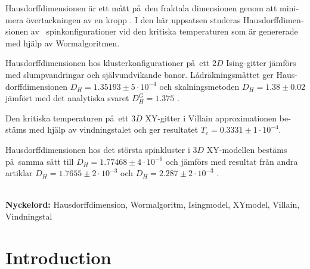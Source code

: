 \documentclass[nocoverpage,swedish,g5paper]{thesis}
\begin{document}
\begin{otherlanguage}{swedish}
\begin{foreginabstract}
Hausdorffdimensionen \"ar ett m\aa tt p\aa \ den fraktala dimensionen genom att minimera \"overtackningen av en kropp \cite{Heinonen:HausdorffDimMath}. I den h\"ar uppsatsen studeras Hausdorffdimensionen av \ spinkonfigurationer vid den kritiska temperaturen som \"ar genererade med hj\"alp av Wormalgoritmen.

Hausdorffdimensionen hos klusterkonfigurationer p\aa \ ett $2D$ Ising-gitter j\"amf\"ors med slumpvandringar och sj\"alvundvikande banor. L\aa dr\"akningsm\aa ttet \cite{strogatz:dynamics_chaos} ger Hausdorffdimensionen $D_H = 1.35193 \pm 5 \cdot 10^{-4}$ och skalningsmetoden \cite{Hove:hausdorff_crit_fluctuations} $D_H = 1.38 \pm 0.02$ j\"amf\"ort med det analytiska svaret $D_H^{G} = 1.375$ \cite{Duplantier:GeoHausdorff}.

Den kritiska temperaturen p\aa \  ett $3D$ XY-gitter i Villain approximationen best\"ams med hj\"alp av vindningstalet och ger resultatet $T_c = 0.3331 \pm 1 \cdot 10^{-4}$.

Hausdorffdimensionen hos det st\"orsta spinkluster i $3D$ XY-modellen best\"ams p\aa\  samma s\"att till $D_H = 1.77468 \pm 4 \cdot 10^{-6}$ och j\"amf\"ors med resultat fr\aa n andra artiklar $D_H = 1.7655 \pm 2 \cdot 10^{-3}$ \cite{Prokofev:comment_on_hove_hausdorff_crit_fluct} och $D_H = 2.287 \pm 2 \cdot 10^{-3}$ \cite{Hove:hausdorff_crit_fluctuations}.
\\ \noindent \strut \\
\textbf{Nyckelord:} Hausdorffdimension, Wormalgoritm, Isingmodel, XYmodel, Villain, Vindningstal
\end{foreginabstract}
\end{otherlanguage}

\begin{preface}

\end{preface}

\tableofcontents

\mainmatter


\chapter{Introduction}

\end{document}
